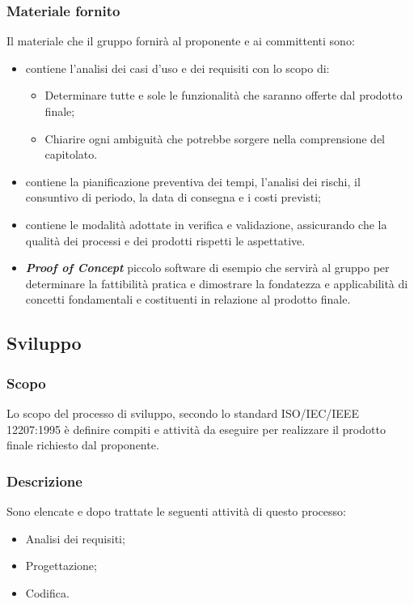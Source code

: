 \subsubsection{Materiale fornito}
Il materiale che il gruppo fornirà al proponente e ai committenti sono:
\begin{itemize}
  \item \textbf{\AdR} contiene l’analisi dei casi d’uso e dei requisiti con lo scopo di: 
	\begin{itemize}
		\item Determinare tutte e sole le funzionalità che saranno offerte dal prodotto finale;
		\item Chiarire ogni ambiguità che potrebbe sorgere nella comprensione del capitolato.
	\end{itemize}  

  \item \textbf{\PdP} contiene la pianificazione preventiva dei tempi, l’analisi dei rischi, il consuntivo di periodo, la data di consegna e i costi previsti;

  \item \textbf{\PdQ} contiene le modalità adottate in verifica e validazione, assicurando che la qualità dei processi e dei prodotti rispetti le aspettative.
  
  \item \textit{\textbf{Proof of Concept}} piccolo software di esempio che servirà al gruppo per determinare la fattibilità pratica e dimostrare la fondatezza e applicabilità di concetti fondamentali e costituenti in relazione al prodotto finale. 

\end{itemize}

\subsection{Sviluppo}
\subsubsection{Scopo}
Lo scopo del processo di sviluppo, secondo lo standard  ISO/IEC/IEEE 12207:1995 è definire compiti e attività da eseguire per realizzare il prodotto finale richiesto dal proponente.
\subsubsection{Descrizione}
Sono elencate e dopo trattate le seguenti attività di questo processo:
\begin{itemize}
  \item Analisi dei requisiti;
  \item Progettazione;
  \item Codifica.
\end{itemize}
